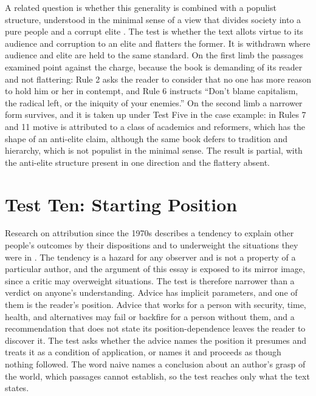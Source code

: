 \documentclass[12pt]{article}
\begin{document}
A related question is whether this generality is combined with a populist structure, understood in the minimal sense of a view that divides society into a pure people and a corrupt elite \cite{mudde2004}. The test is whether the text allots virtue to its audience and corruption to an elite and flatters the former. It is withdrawn where audience and elite are held to the same standard. On the first limb the passages examined point against the charge, because the book is demanding of its reader and not flattering: Rule 2 asks the reader to consider that no one has more reason to hold him or her in contempt, and Rule 6 instructs ``Don't blame capitalism, the radical left, or the iniquity of your enemies.'' On the second limb a narrower form survives, and it is taken up under Test Five in the case example: in Rules 7 and 11 motive is attributed to a class of academics and reformers, which has the shape of an anti-elite claim, although the same book defers to tradition and hierarchy, which is not populist in the minimal sense. The result is partial, with the anti-elite structure present in one direction and the flattery absent.

\section{Test Ten: Starting Position}\label{sec:t10}

Research on attribution since the 1970s describes a tendency to explain other people's outcomes by their dispositions and to underweight the situations they were in \cite{ross1977}. The tendency is a hazard for any observer and is not a property of a particular author, and the argument of this essay is exposed to its mirror image, since a critic may overweight situations. The test is therefore narrower than a verdict on anyone's understanding. Advice has implicit parameters, and one of them is the reader's position. Advice that works for a person with security, time, health, and alternatives may fail or backfire for a person without them, and a recommendation that does not state its position-dependence leaves the reader to discover it. The test asks whether the advice names the position it presumes and treats it as a condition of application, or names it and proceeds as though nothing followed. The word naive names a conclusion about an author's grasp of the world, which passages cannot establish, so the test reaches only what the text states.
\end{document}
